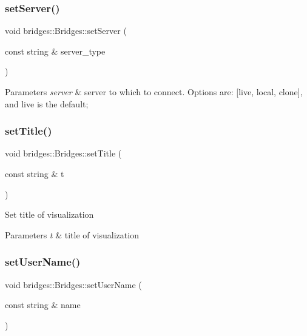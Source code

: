 \subsubsection{\texorpdfstring{set\+Server()}{setServer()}}
{\footnotesize\ttfamily void bridges\+::\+Bridges\+::set\+Server (\begin{DoxyParamCaption}\item[{const string \&}]{server\+\_\+type }\end{DoxyParamCaption})\hspace{0.3cm}{\ttfamily [inline]}}


\begin{DoxyParams}{Parameters}
{\em server} & server to which to connect. Options are\+: \mbox{[}\textquotesingle{}live\textquotesingle{}, \textquotesingle{}local\textquotesingle{}, \textquotesingle{}clone\textquotesingle{}\mbox{]}, and \textquotesingle{}live\textquotesingle{} is the default; \\
\hline
\end{DoxyParams}
\mbox{\label{classbridges_1_1_bridges_ac9f2e0b5fd5c70053db233dcbb636b56}} 
\subsubsection{\texorpdfstring{set\+Title()}{setTitle()}}
{\footnotesize\ttfamily void bridges\+::\+Bridges\+::set\+Title (\begin{DoxyParamCaption}\item[{const string \&}]{t }\end{DoxyParamCaption})\hspace{0.3cm}{\ttfamily [inline]}}

Set title of visualization


\begin{DoxyParams}{Parameters}
{\em t} & title of visualization \\
\hline
\end{DoxyParams}
\mbox{\label{classbridges_1_1_bridges_ab0b00033e54d25968f5ecb61c31c7de3}} 
\subsubsection{\texorpdfstring{set\+User\+Name()}{setUserName()}}
{\footnotesize\ttfamily void bridges\+::\+Bridges\+::set\+User\+Name (\begin{DoxyParamCaption}\item[{const string \&}]{name }\end{DoxyParamCaption})\hspace{0.3cm}{\ttfamily [inline]}}



